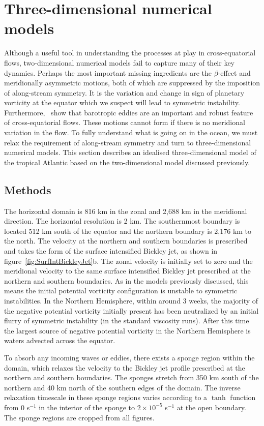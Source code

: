 \section{Three-dimensional numerical models}
\label{sec:3DModels}
Although a useful tool in understanding the processes at play in cross-equatorial flows, two-dimensional numerical models fail to capture many of their key dynamics.
Perhaps the most important missing ingredients are the $\beta$-effect and meridionally asymmetric motions, both of which are suppressed by the imposition of along-stream symmetry. It is the variation and change in sign of planetary vorticity at the equator which we suspect will lead to symmetric instability. Furthermore,~\citet{Edwards1998II} show that barotropic eddies are an important and robust feature of cross-equatorial flows. These motions cannot form if there is no meridional variation in the flow. To fully understand what is going on in the ocean, we must relax the requirement of along-stream symmetry and turn to three-dimensional numerical models. This section describes an idealised three-dimensional model of the tropical Atlantic based on the two-dimensional model discussed previously.

\subsection{Methods}
The horizontal domain is 816 km in the zonal and 2,688 km in the meridional direction. The horizontal resolution is 2 km. The southernmost boundary is located 512 km south of the equator and the northern boundary is 2,176 km to the north. The velocity at the northern and southern boundaries is prescribed and takes the form of the surface intensified Bickley jet, as shown in figure~\ref{fig:SurfIntBickleyJet}b. The zonal velocity is initially set to zero and the meridional velocity to the same surface intensified Bickley jet prescribed at the northern and southern boundaries. As in the models previously discussed, this means the initial potential vorticity configuration is unstable to symmetric instabilities. In the Northern Hemisphere, within around 3 weeks, the majority of the negative potential vorticity initially present has been neutralized by an initial flurry of symmetric instability (in the standard viscosity runs). After this time the largest source of negative potential vorticity in the Northern Hemisphere is waters advected across the equator.

To absorb any incoming waves or eddies, there exists a sponge region within the domain, which relaxes the velocity to the Bickley jet profile prescribed at the northern and southern boundaries. The sponges stretch from 350 km south of the northern and 40 km north of the southern edges of the domain. The inverse relaxation timescale in these sponge regions varies according to a $\tanh$ function from 0 s$^{-1}$ in the interior of the sponge to $2 \times 10^{-5}$ s$^{-1}$ at the open boundary. The sponge regions are cropped from all figures.

